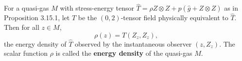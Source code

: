 For a quasi-gas $M$ with stress-energy tensor $\hat{T} = \rho Z \otimes Z + p(\hat{g} + Z \otimes Z)$ as in Proposition 3.15.1, let $T$ be the $(0,2)$-tensor field physically equivalent to $\hat{T}$. Then for all $z \in M$,
$$\rho(z) = T(Z_z, Z_z),$$
the energy density of $\hat{T}$ observed by the instantaneous observer $(z, Z_z)$. The scalar function $\rho$ is called the \textbf{energy density} of the quasi-gas $M$.
